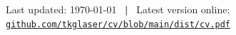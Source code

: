 \documentclass[11pt,a4paper,sans]{moderncv}        %
\begin{document}
\vfill
\begin{center}
\small\color{gray}
Last updated: \today{} ~\textbf{|}~ Latest version online: \href{https://github.com/tkglaser/cv/blob/main/dist/cv.pdf}{\color{gray}\texttt{github.com/tkglaser/cv/blob/main/dist/cv.pdf}}
\end{center}

%
%
%
%
%
%

\end{document}
